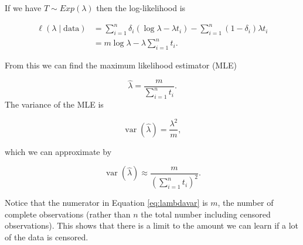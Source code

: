\documentclass[
  openany]{book}
\theoremstyle{definition}
\theoremstyle{definition}
\theoremstyle{definition}
\theoremstyle{definition}
\theoremstyle{remark}
\begin{document}
If we have \(T\sim Exp\left(\lambda\right)\) then the log-likelihood is

\begin{align*}
\ell\left(\lambda \mid \text{data}\right) &= \sum\limits_{i=1}^n \delta_i\left(\log\lambda - \lambda t_i\right) - \sum\limits_{i=1}^n\left(1-\delta_i\right)\lambda t_i \\
& =  m\log\lambda - \lambda\sum\limits_{i=1}^n t_i. 
\end{align*}

From this we can find the maximum likelihood estimator (MLE)

\[\hat{\lambda} = \frac{m}{\sum\limits_{i=1}^n t_i}.\]
The variance of the MLE is

\begin{equation}
\operatorname{var}\left(\hat\lambda\right) = \frac{\lambda^2}{m},
\label{eq:lambdavar}
\end{equation}

which we can approximate by

\[\operatorname{var}\left(\hat\lambda\right) \approx \frac{m}{\left(\sum\limits_{i=1}^n t_i\right)^2}.\]

Notice that the numerator in Equation \eqref{eq:lambdavar} is \(m\), the number of complete observations (rather than \(n\) the total number including censored observations). This shows that there is a limit to the amount we can learn if a lot of the data is censored.
\end{document}
